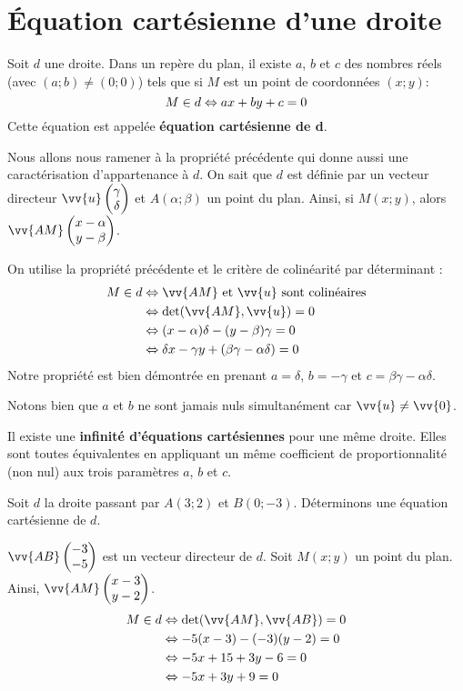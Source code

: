 \documentclass[cours,couleur]{mathsRC}
\begin{document}
\section{Équation cartésienne d'une droite}

\begin{propriete}
Soit $d$ une droite. Dans un repère du plan, il existe $a$, $b$ et $c$ des nombres réels (avec $(a;b)\neq (0;0)$) tels que si $M$ est un point de coordonnées $(x;y)$:
\[
M\in d \Leftrightarrow ax+by+c=0
\]
Cette équation est appelée \textbf{équation cartésienne de d}.
\end{propriete}

\begin{demonstration}
Nous allons nous ramener à la propriété précédente qui donne aussi une caractérisation d'appartenance à $d$. On sait que $d$ est définie par un vecteur directeur $\vv{u}\coorddeux{\gamma}{\delta}$ et $A(\alpha;\beta)$ un point du plan. Ainsi, si $M(x;y)$, alors $\vv{AM}\coorddeux{x-\alpha}{y-\beta}$. 

On utilise la propriété précédente et le critère de colinéarité par déterminant :
\begin{align*}
M\in d &\ssi  \vv{AM}\text{ et }\vv{u}\text{ sont colinéaires}\\
&\ssi \det (\vv{AM}, \vv{u})=0\\
&\ssi (x-\alpha)\delta-(y-\beta)\gamma=0\\
&\ssi \delta x - \gamma y +(\beta \gamma - \alpha \delta)=0\\
\end{align*}
Notre propriété est bien démontrée en prenant $a= \delta$, $b=- \gamma$ et $c= \beta \gamma - \alpha \delta$. 

Notons bien que $a$ et $b$ ne sont jamais nuls simultanément car $\vv{u}\neq\vv{0}$.
\end{demonstration}

\begin{remarque}
Il existe une \textbf{infinité d'équations cartésiennes} pour une même droite. Elles sont toutes équivalentes en appliquant un même coefficient de proportionnalité (non nul) aux trois paramètres $a$, $b$ et $c$.
\end{remarque}

\begin{exemple}
Soit $d$ la droite passant par $A(3;2)$ et $B(0;-3)$. Déterminons une équation cartésienne de $d$.

$\vv{AB}\coorddeux{-3}{-5}$ est un vecteur directeur de $d$. Soit $M(x;y)$ un point du plan. Ainsi, $\vv{AM}\coorddeux{x-3}{y-2}$.
\begin{align*}
M\in d &\ssi \det(\vv{AM},\vv{AB})=0\\
&\ssi -5(x-3)-(-3)(y-2)=0\\
&\ssi -5x+15+3y-6=0\\
&\ssi -5x+3y+9=0
\end{align*}
\end{exemple}
\end{document}
